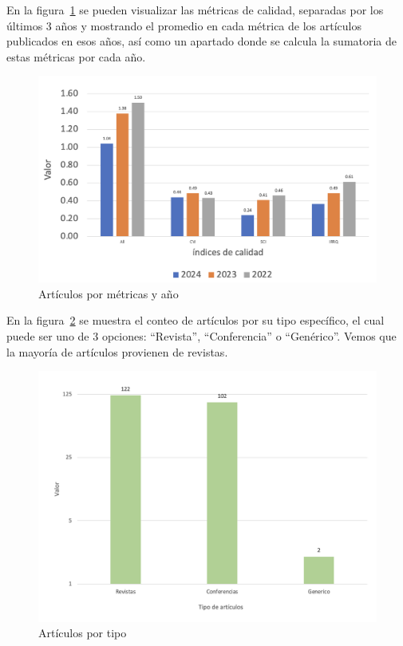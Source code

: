 \noindent
En la figura~\ref{fig:diagrama-articulos-ano-metrica} se pueden visualizar las métricas de calidad, separadas por los últimos 3 años y mostrando el promedio en cada métrica de los artículos publicados en esos años, así como un apartado donde se calcula la sumatoria de estas métricas por cada año.
\begin{figure}[H]
    \centering
    \includegraphics[scale=0.7]{tablas-images/cp2/diagrama-articulos-ano-metrica.png}
    \caption{Artículos por métricas y año}\label{fig:diagrama-articulos-ano-metrica}
\end{figure}
\noindent
En la figura~\ref{fig:tipos-articulos} se muestra el conteo de artículos por su tipo específico, el cual puede ser uno de 3 opciones: ``Revista'', ``Conferencia'' o ``Genérico''. Vemos que la mayoría de artículos provienen de revistas.
\begin{figure}[H]
    \centering
    \includegraphics[scale=0.4]{tablas-images/cp2/tipos-articulos.png}
    \caption{Artículos por tipo}\label{fig:tipos-articulos}
\end{figure}
